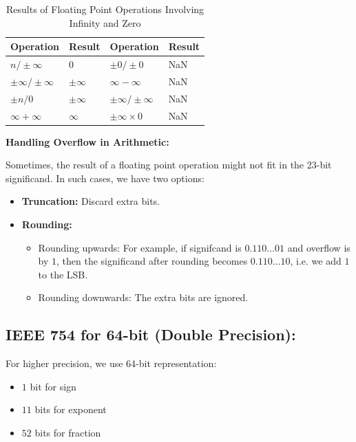 \documentclass[12pt]{book}
\begin{document}
\begin{itemize}
\begin{table}[H]
\centering
\renewcommand{\arraystretch}{1.4}
\begin{tabularx}{\textwidth}{|>{\centering\arraybackslash}X|>{\centering\arraybackslash}X|
                                >{\centering\arraybackslash}X|>{\centering\arraybackslash}X|}
\hline
\textbf{Operation} & \textbf{Result} & \textbf{Operation} & \textbf{Result} \\
\hline
$n / \pm \infty$ & $0$ & $\pm 0 / \pm 0$ & NaN \\
\hline
$\pm \infty / \pm \infty$ & $\pm \infty$ & $\infty - \infty$ & NaN \\
\hline
$\pm n / 0$ & $\pm \infty$ & $\pm \infty / \pm \infty$ & NaN \\
\hline
$\infty + \infty$ & $\infty$ & $\pm \infty \times 0$ & NaN \\
\hline
\end{tabularx}
\caption{Results of Floating Point Operations Involving Infinity and Zero}
\label{tab:ieee754-operations}
\end{table}



\medskip
\textbf{Handling Overflow in Arithmetic:}

Sometimes, the result of a floating point operation might not fit in the 23-bit significand. In such cases, we have two options:
\begin{itemize}
    \item \textbf{Truncation:} Discard extra bits.
    \item \textbf{Rounding:}
    \begin{itemize}
        \item Rounding upwards: For example, if signifcand is $0.110\ldots 01$ and overflow is by $1$, then the significand after rounding becomes $0.110\ldots 10$, i.e. we add $1$ to the LSB.
        \item Rounding downwards: The extra bits are ignored.
    \end{itemize}
\end{itemize}

\medskip
\subsection*{IEEE 754 for 64-bit (Double Precision):}  
For higher precision, we use 64-bit representation:
\begin{itemize}
    \item $1$ bit for sign
    \item $11$ bits for exponent
    \item $52$ bits for fraction
\end{itemize}
\end{itemize}
\end{document}
